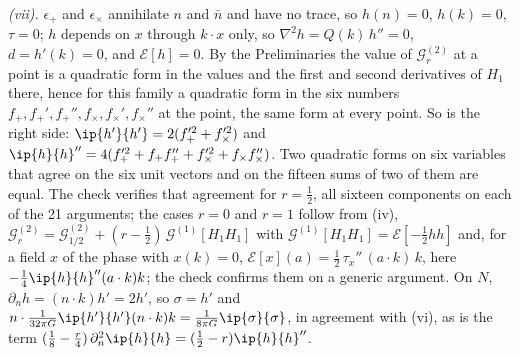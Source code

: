 \emph{(vii).} $\epsilon_{+}$ and $\epsilon_{\times}$ annihilate $n$ and $\bar n$ and have no trace, so $h(n) = 0$, $h(k) = 0$, $\tau = 0$; $h$ depends on $x$ through $k \cdot x$ only, so $\nabla^{2}h = Q(k)\,h'' = 0$, $d = h'(k) = 0$, and $\mathcal{E}[h] = 0$. By the Preliminaries the value of $\mathcal{G}^{(2)}_{r}$ at a point is a quadratic form in the values and the first and second derivatives of $H_{1}$ there, hence for this family a quadratic form in the six numbers $f_{+}, f_{+}', f_{+}'', f_{\times}, f_{\times}', f_{\times}''$ at the point, the same form at every point. So is the right side: $\ip{h'}{h'} = 2(f_{+}'^{2} + f_{\times}'^{2})$ and $\ip{h}{h}'' = 4(f_{+}'^{2} + f_{+}f_{+}'' + f_{\times}'^{2} + f_{\times}f_{\times}'')$. Two quadratic forms on six variables that agree on the six unit vectors and on the fifteen sums of two of them are equal. The check verifies that agreement for $r = \tfrac12$, all sixteen components on each of the 21 arguments; the cases $r = 0$ and $r = 1$ follow from (iv), $\mathcal{G}^{(2)}_{r} = \mathcal{G}^{(2)}_{1/2} + (r - \tfrac12)\,\mathcal{G}^{(1)}[H_{1}H_{1}]$ with $\mathcal{G}^{(1)}[H_{1}H_{1}] = \mathcal{E}[-\tfrac12 hh]$ and, for a field $x$ of the phase with $x(k) = 0$, $\mathcal{E}[x](a) = \tfrac12\,\tau_{x}''\,(a \cdot k)\,k$, here $-\tfrac14\ip{h}{h}''(a \cdot k)k$; the check confirms them on a generic argument. On $N$, $\partial_{n}h = (n \cdot k)h' = 2h'$, so $\sigma = h'$ and $n \cdot \tfrac{1}{32\pi G}\ip{h'}{h'}(n \cdot k)k = \tfrac{1}{8\pi G}\ip{\sigma}{\sigma}$, in agreement with (vi), as is the term $(\tfrac18 - \tfrac{r}{4})\,\partial_{n}^{2}\ip{h}{h} = (\tfrac12 - r)\ip{h}{h}''$.

